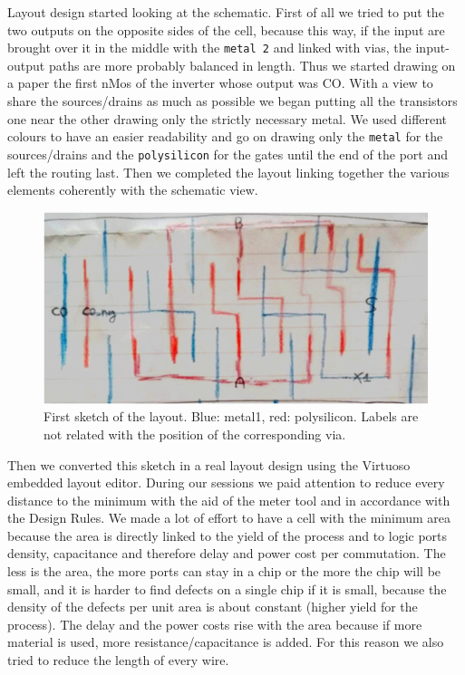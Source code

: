 \documentclass[a4paper]{article}
\begin{document}
Layout design started looking at the schematic. First of all we tried to put the two outputs on the opposite sides of the cell, because this way, if the input are brought over it in the middle with the \texttt{metal 2} and linked with vias, the input-output paths are more probably balanced in length. 
Thus we started drawing on a paper the first nMos of the inverter whose output was CO. With a view to share the sources/drains as much as possible we began putting all the transistors one near the other drawing only the strictly necessary metal.
We used different colours to have an easier readability and go on drawing only the \texttt{metal} for the sources/drains and the \texttt{polysilicon} for the gates until the end of the port and left the routing last. Then we completed the layout linking together the various elements coherently with the schematic view.

\begin{figure}[H]
      \centering
       \includegraphics[width=12cm]{./Images/HA/layout_drw.png}
\caption{First sketch of the layout. Blue: metal1, red: polysilicon. Labels are not related with the position of the corresponding via.}
\label{fig: lay_drw}
\end{figure}

Then we converted this sketch in a real layout design using the Virtuoso embedded layout editor. During our sessions we paid attention to reduce every distance to the minimum with the aid of the meter tool and in accordance with the Design Rules. We made a lot of effort to have a cell with the minimum area because the area is directly linked to the yield of the process and to logic ports density, capacitance and therefore delay and power cost per commutation. The less is the area, the more ports can stay in a chip or the more the chip will be small, and it is harder to find defects on a single chip if it is small, because the density of the defects per unit area is about constant (higher yield for the process). The delay and the power costs rise with the area because if more material is used, more resistance/capacitance is added. For this reason we also tried to reduce the length of every wire.
\end{document}
